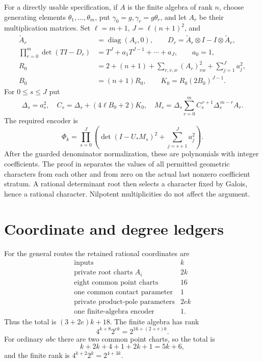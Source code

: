 \documentclass[11pt]{article}
\begin{document}
For a directly usable specification, if \(A\) is the finite
algebra of rank \(n\), choose generating elements
\(\theta_1,\ldots,\theta_m\), put
\(\gamma_0=g,\gamma_r=g\theta_r\), and let \(A_r\) be their
multiplication matrices. Set \(\ell=m+1\), \(J=\ell(n+1)^2\),
and
\[
\begin{split}
 \widetilde A_r&=\operatorname{diag}(A_r,0),\qquad
 D_r=\widetilde A_r\otimes I-I\otimes\widetilde A_r,\\
 \prod_{r=0}^{m}\det(TI-D_r)
       &=T^J+a_1T^{J-1}+\cdots+a_J,\qquad a_0=1,\\
 R_0&=2+(n+1)+\sum_{r,v,w}(A_r)_{vw}^2+\sum_{j=1}^{J}a_j^2,\\
 B_0&=(n+1)R_0,\qquad K_0=R_0(2B_0)^{J-1}.
\end{split}
\]
For \(0\le s\le J\) put
\[
 \Delta_s=a_s^2,\quad
 C_s=\Delta_s+(4\ell B_0+2)K_0,\quad
 M_s=\Delta_s\sum_{r=0}^{m}C_s^{\,r+1}\Delta_s^{\,m-r}A_r .
\]
The required encoder is
\begin{equation}\label{eq:encoder}
 \Phi_k=
 \prod_{s=0}^{J}
 \left(\det(I-U_*M_s)^2+\sum_{j=s+1}^{J}a_j^2\right).
\end{equation}
After the guarded denominator normalization, these are
polynomials with integer coefficients. The proof in
\cite{shared} separates the values of all permitted geometric
characters from each other and from zero on the actual last
nonzero coefficient stratum. A rational determinant root then
selects a character fixed by Galois, hence a rational character.
Nilpotent multiplicities do not affect the argument.

\section{Coordinate and degree ledgers}
\label{sec:counts}

For the general routes the retained rational coordinates are
\[
\begin{array}{lr}
 \text{inputs}&k\\
 \text{private root charts }A_i&2k\\
 \text{eight common point charts}&16\\
 \text{one common contact parameter}&1\\
 \text{private product-pole parameters}&2ek\\
 \text{one finite-algebra encoder}&1.
\end{array}
\]
Thus the total is \((3+2e)k+18\). The finite algebra has rank
\[
                   4^{k+8}2^{ek}=2^{16+(2+e)k}.
\]
For ordinary \(abc\) there are two common point charts, so
the total is
\[
                    k+2k+4+1+2k+1=5k+6,
\]
and the finite rank is \(4^{k+2}2^k=2^{4+3k}\).
\end{document}
